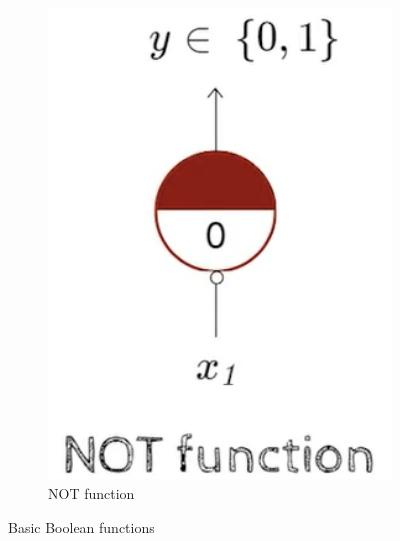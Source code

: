 \documentclass[a4paper]{article}
\begin{document}
\begin{itemize}
\begin{figure}[H]
\begin{subfigure}[b]{0.225\textwidth}
            \includegraphics[width=1\textwidth]{Degree//static/DL_Pitts_NOT.png}
            \caption{NOT function}
            \label{fig:DL-pitts-NOT}
        \end{subfigure}
        \caption{Basic Boolean functions}
        \label{fig:DL-basic-boolean}
    \end{figure}
\end{itemize}
\end{document}
